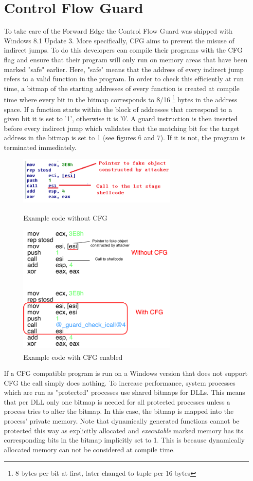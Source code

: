 \documentclass[10pt,twocolumn,a4paper]{article}
\begin{document}
\section{Control Flow Guard}\label{CFG}
To take care of the Forward Edge the Control Flow Guard was shipped with Windows 8.1 Update 3.
More specifically, CFG aims to prevent the misuse of indirect jumps.
To do this developers can compile their programs with the CFG flag and ensure that their program will only run on memory areas that have been marked "safe" earlier.
Here, "safe" means that the address of every indirect jump refers to a valid function in the program.
In order to check this efficiently at run time, a bitmap of the starting addresses of every function is created at compile time where every bit in the bitmap corresponds to 8/16 \footnote{8 bytes per bit at first, later changed to tuple per 16 bytes} bytes in the address space.
If a function starts within the block of addresses that correspond to a given bit it is set to '1', otherwise it is '0'.
A guard instruction is then inserted before every indirect jump which validates that the matching bit for the target address in the bitmap is set to 1 (see figures 6 and 7). If it is not, the program is terminated immediately.
\begin{figure}[htbp]
	\includegraphics[keepaspectratio,width=8cm]{fig/nocfg}
	\caption{Example code without CFG\textsuperscript{\cite{cfgexplore}}}
	\includegraphics[keepaspectratio,width=8cm]{fig/cfg}
	\caption{Example code with CFG enabled\textsuperscript{\cite{cfgexplore}}}
\end{figure}
If a CFG compatible program is run on a Windows version that does not support CFG the call simply does nothing.
To increase performance, system processes which are run as "protected" processes use shared bitmaps for DLLs.
This means that per DLL only one bitmap is needed for all protected processes unless a process tries to alter the bitmap. In this case, the bitmap is mapped into the process' private memory.
Note that dynamically generated functions cannot be protected this way as explicitly allocated and \emph{executable} marked memory has its corresponding bits in the bitmap implicitly set to 1.
This is because dynamically allocated memory can not be considered at compile time.
\end{document}
